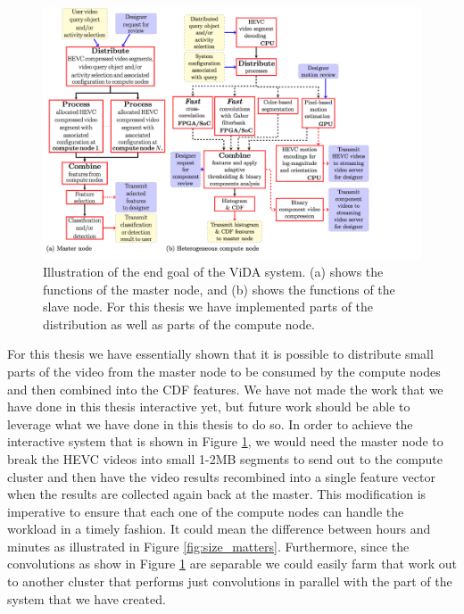  \begin{figure}[h]
   \label{fig:full_system}
   \centering
   \includegraphics[width=\textwidth]{figures/full_system}
   \caption{Illustration of the end goal of the ViDA system. (a) shows the
   functions of the master node, and (b) shows the functions of the slave node.
   For this thesis we have implemented parts of the distribution as well as parts
   of the compute node.}
 \end{figure}

 \FloatBarrier

 For this thesis we have essentially shown that it is possible to distribute
 small parts of the video from the master node to be consumed by the compute nodes
 and then combined into the CDF features. We have not made the work that we have
 done in this thesis interactive yet, but future work should be able to leverage
 what we have done in this thesis to do so. In order to achieve the interactive
 system that is shown in Figure \ref{fig:full_system}, we would need the master
 node to break the HEVC videos into small 1-2MB segments to send out to the compute
 cluster and then have the video results recombined into a single feature vector
 when the results are collected again back at the master. This modification is
 imperative to ensure that each one of the compute nodes can handle the workload
 in a timely fashion. It could mean the difference between hours and minutes
 as illustrated in Figure \ref{fig:size_matters}. Furthermore, since the convolutions
 as show in Figure \ref{fig:full_system} are separable we could easily farm that
 work out to another cluster that performs just convolutions in parallel with
 the part of the system that we have created.
